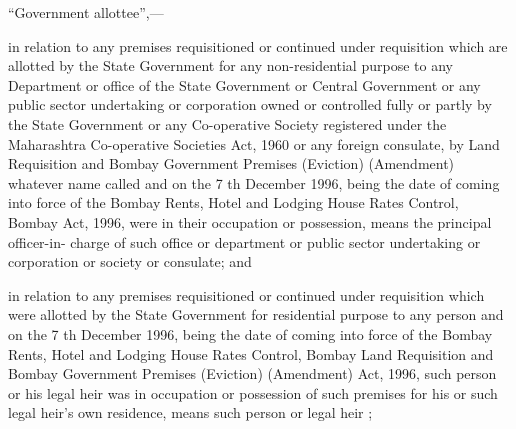 \documentclass{mhact}
\begin{document}
\begin{subsectionlist}
\item ``Government allottee'',--- \label{it:galot}
  \begin{clause}
    \item in relation to any premises requisitioned or continued under
    requisition which are allotted by the State Government for any
    non-residential purpose to any Department or office of the State
    Government or Central Government or any public sector undertaking
    or corporation owned or controlled fully or partly by the State
    Government or any Co-operative Society registered under the
    Maharashtra Co-operative Societies Act, 1960 or any foreign consulate, by Land Requisition and Bombay
    Government Premises (Eviction) (Amendment) whatever name called
    and on the 7 th December 1996, being the date of coming into force
    of the Bombay Rents, Hotel and Lodging House Rates Control, Bombay
    Act, 1996, were in their occupation or possession, means the
    principal officer-in- charge of such office or department or
    public sector undertaking or corporation or society or consulate;
    and
    \label{it:galota}
  \item in relation to any premises requisitioned or continued under
    requisition which were allotted by the State Government for
    residential purpose to any person and on the 7 th December 1996,
    being the date of coming into force of the Bombay Rents, Hotel and
    Lodging House Rates Control, Bombay Land Requisition and Bombay
    Government Premises (Eviction) (Amendment) Act,
    1996, such person or his legal heir was
    in occupation or possession of such premises for his or such legal
    heir's own residence, means such person or legal heir ;
  \end{clause}
  

\end{subsectionlist}
\end{document}
